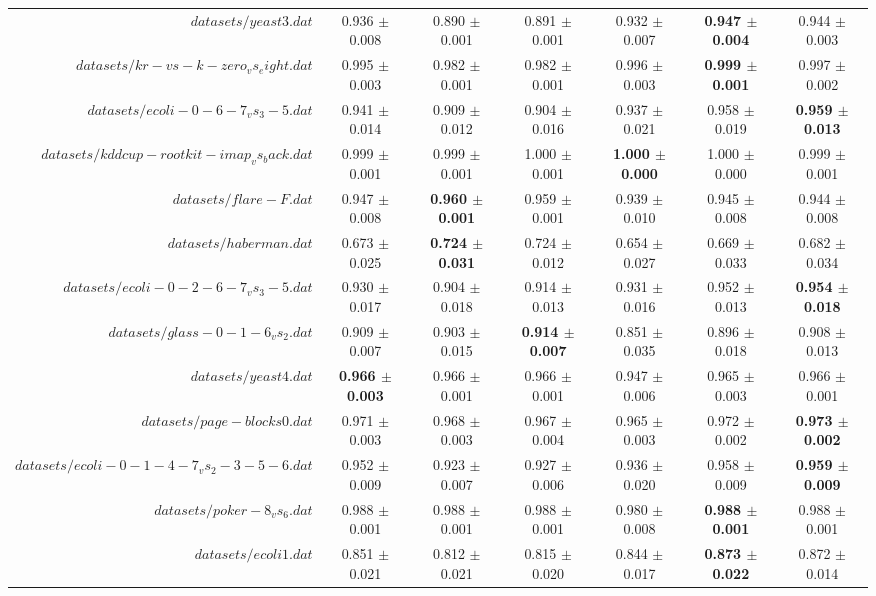 \begin{table}[!ht]
{\begin{tabular}{r c c c c c c}
$datasets/yeast3.dat$ & 0.936 $\pm$ 0.008 & 0.890 $\pm$ 0.001 & 0.891 $\pm$ 0.001 & 0.932 $\pm$ 0.007 & \textbf{0.947 $\pm$ 0.004} & 0.944 $\pm$ 0.003 \\
$datasets/kr-vs-k-zero_vs_eight.dat$ & 0.995 $\pm$ 0.003 & 0.982 $\pm$ 0.001 & 0.982 $\pm$ 0.001 & 0.996 $\pm$ 0.003 & \textbf{0.999 $\pm$ 0.001} & 0.997 $\pm$ 0.002 \\
$datasets/ecoli-0-6-7_vs_3-5.dat$ & 0.941 $\pm$ 0.014 & 0.909 $\pm$ 0.012 & 0.904 $\pm$ 0.016 & 0.937 $\pm$ 0.021 & 0.958 $\pm$ 0.019 & \textbf{0.959 $\pm$ 0.013} \\
$datasets/kddcup-rootkit-imap_vs_back.dat$ & 0.999 $\pm$ 0.001 & 0.999 $\pm$ 0.001 & 1.000 $\pm$ 0.001 & \textbf{1.000 $\pm$ 0.000} & 1.000 $\pm$ 0.000 & 0.999 $\pm$ 0.001 \\
$datasets/flare-F.dat$ & 0.947 $\pm$ 0.008 & \textbf{0.960 $\pm$ 0.001} & 0.959 $\pm$ 0.001 & 0.939 $\pm$ 0.010 & 0.945 $\pm$ 0.008 & 0.944 $\pm$ 0.008 \\
$datasets/haberman.dat$ & 0.673 $\pm$ 0.025 & \textbf{0.724 $\pm$ 0.031} & 0.724 $\pm$ 0.012 & 0.654 $\pm$ 0.027 & 0.669 $\pm$ 0.033 & 0.682 $\pm$ 0.034 \\
$datasets/ecoli-0-2-6-7_vs_3-5.dat$ & 0.930 $\pm$ 0.017 & 0.904 $\pm$ 0.018 & 0.914 $\pm$ 0.013 & 0.931 $\pm$ 0.016 & 0.952 $\pm$ 0.013 & \textbf{0.954 $\pm$ 0.018} \\
$datasets/glass-0-1-6_vs_2.dat$ & 0.909 $\pm$ 0.007 & 0.903 $\pm$ 0.015 & \textbf{0.914 $\pm$ 0.007} & 0.851 $\pm$ 0.035 & 0.896 $\pm$ 0.018 & 0.908 $\pm$ 0.013 \\
$datasets/yeast4.dat$ & \textbf{0.966 $\pm$ 0.003} & 0.966 $\pm$ 0.001 & 0.966 $\pm$ 0.001 & 0.947 $\pm$ 0.006 & 0.965 $\pm$ 0.003 & 0.966 $\pm$ 0.001 \\
$datasets/page-blocks0.dat$ & 0.971 $\pm$ 0.003 & 0.968 $\pm$ 0.003 & 0.967 $\pm$ 0.004 & 0.965 $\pm$ 0.003 & 0.972 $\pm$ 0.002 & \textbf{0.973 $\pm$ 0.002} \\
$datasets/ecoli-0-1-4-7_vs_2-3-5-6.dat$ & 0.952 $\pm$ 0.009 & 0.923 $\pm$ 0.007 & 0.927 $\pm$ 0.006 & 0.936 $\pm$ 0.020 & 0.958 $\pm$ 0.009 & \textbf{0.959 $\pm$ 0.009} \\
$datasets/poker-8_vs_6.dat$ & 0.988 $\pm$ 0.001 & 0.988 $\pm$ 0.001 & 0.988 $\pm$ 0.001 & 0.980 $\pm$ 0.008 & \textbf{0.988 $\pm$ 0.001} & 0.988 $\pm$ 0.001 \\
$datasets/ecoli1.dat$ & 0.851 $\pm$ 0.021 & 0.812 $\pm$ 0.021 & 0.815 $\pm$ 0.020 & 0.844 $\pm$ 0.017 & \textbf{0.873 $\pm$ 0.022} & 0.872 $\pm$ 0.014 \\

\end{tabular}}
\end{table}
